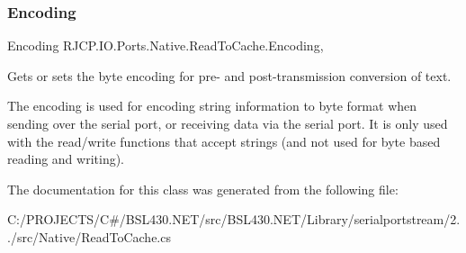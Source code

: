 \subsubsection{\texorpdfstring{Encoding}{Encoding}}
{\footnotesize\ttfamily Encoding R\+J\+C\+P.\+I\+O.\+Ports.\+Native.\+Read\+To\+Cache.\+Encoding\hspace{0.3cm}{\ttfamily [get]}, {\ttfamily [set]}}



Gets or sets the byte encoding for pre-\/ and post-\/transmission conversion of text. 

The encoding is used for encoding string information to byte format when sending over the serial port, or receiving data via the serial port. It is only used with the read/write functions that accept strings (and not used for byte based reading and writing). 

The documentation for this class was generated from the following file\+:\begin{DoxyCompactItemize}
\item 
C\+:/\+P\+R\+O\+J\+E\+C\+T\+S/\+C\#/\+B\+S\+L430.\+N\+E\+T/src/\+B\+S\+L430.\+N\+E\+T/\+Library/serialportstream/2../src/\+Native/Read\+To\+Cache.\+cs\end{DoxyCompactItemize}
